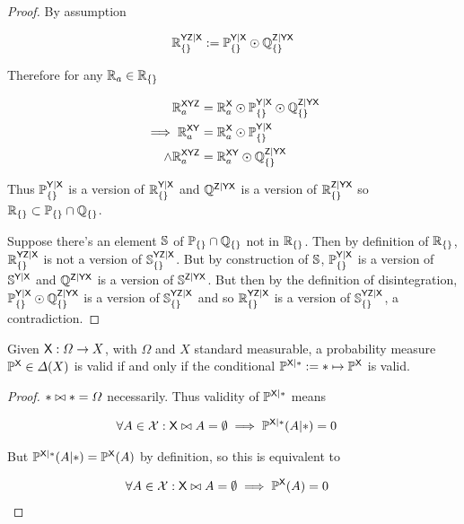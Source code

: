 \begin{proof}
By assumption

\begin{align}
    \mathbb{R}_{\{\}}^{\mathsf{YZ}|\mathsf{X}}:=\mathbb{P}_{\{\}}^{\mathsf{Y}|\mathsf{X}}\odot \mathbb{Q}_{\{\}}^{\mathsf{Z}|\mathsf{YX}}
\end{align}

Therefore for any $\mathbb{R}_a\in\mathbb{R}_{\{\}}$

\begin{align}
    \mathbb{R}_{a}^{\mathsf{XYZ}} &= \mathbb{R}_a^{\mathsf{X}}\odot \mathbb{P}_{\{\}}^{\mathsf{Y}|\mathsf{X}}\odot \mathbb{Q}_{\{\}}^{\mathsf{Z}|\mathsf{YX}}\\
    \implies \mathbb{R}_{a}^{\mathsf{XY}} &= \mathbb{R}_a^{\mathsf{X}}\odot \mathbb{P}_{\{\}}^{\mathsf{Y}|\mathsf{X}}\\
    \land \mathbb{R}_{a}^{\mathsf{XYZ}} &= \mathbb{R}_{a}^{\mathsf{XY}}\odot \mathbb{Q}_{\{\}}^{\mathsf{Z}|\mathsf{YX}}
\end{align}

Thus $\mathbb{P}_{\{\}}^{\mathsf{Y}|\mathsf{X}}$ is a version of $\mathbb{R}_{\{\}}^{\mathsf{Y}|\mathsf{X}}$ and $\mathbb{Q}^{\mathsf{Z}|\mathsf{YX}}$ is a version of $\mathbb{R}_{\{\}}^{\mathsf{Z}|\mathsf{YX}}$ so $\mathbb{R}_{\{\}}\subset \mathbb{P}_{\{\}}\cap\mathbb{Q}_{\{\}}$.

Suppose there's an element $\mathbb{S}$ of $\mathbb{P}_{\{\}}\cap\mathbb{Q}_{\{\}}$ not in $\mathbb{R}_{\{\}}$. Then by definition of $\mathbb{R}_{\{\}}$, $\mathbb{R}_{\{\}}^{\mathsf{YZ}|\mathsf{X}}$ is not a version of $\mathbb{S}_{\{\}}^{\mathsf{YZ}|\mathsf{X}}$. But by construction of $\mathbb{S}$, $\mathbb{P}_{\{\}}^{\mathsf{Y}|\mathsf{X}}$  is a version of $\mathbb{S}^{\mathsf{Y}|\mathsf{X}}$ and  $\mathbb{Q}^{\mathsf{Z}|\mathsf{YX}}$ is a version of $\mathbb{S}^{\mathsf{Z}|\mathsf{YX}}$. But then by the definition of disintegration, $\mathbb{P}_{\{\}}^{\mathsf{Y}|\mathsf{X}} \odot \mathbb{Q}_{\{\}}^{\mathsf{Z}|\mathsf{YX}}$ is a version of $\mathbb{S}_{\{\}}^{\mathsf{YZ}|\mathsf{X}}$ and so $\mathbb{R}_{\{\}}^{\mathsf{YZ}|\mathsf{X}}$ is a version of $\mathbb{S}_{\{\}}^{\mathsf{YZ}|\mathsf{X}}$, a contradiction.
\end{proof}


\begin{lemma}\label{th:valid_agree}
Given $\mathsf{X}:\Omega\to X$, with $\Omega$ and $X$ standard measurable, a probability measure $\mathbb{P}^{\mathsf{X}}\in \Delta(X)$ is valid if and only if the conditional $\mathbb{P}^{\mathsf{X}|*}:=*\mapsto \mathbb{P}^{\mathsf{X}}$ is valid.
\end{lemma}

\begin{proof}
$*\bowtie *=\Omega$ necessarily. Thus validity of $\mathbb{P}^{\mathsf{X}|*}$ means 

\begin{align}
    \forall A\in \mathcal{X}: \mathsf{X}\bowtie A=\emptyset \implies \mathbb{P}^{\mathsf{X}|*}(A|*)&=0
\end{align}

But $\mathbb{P}^{\mathsf{X}|*}(A|*)=\mathbb{P}^{\mathsf{X}}(A)$ by definition, so this is equivalent to

\begin{align}
    \forall A\in \mathcal{X}: \mathsf{X}\bowtie A=\emptyset \implies \mathbb{P}^{\mathsf{X}}(A)&=0
\end{align}
\end{proof}


